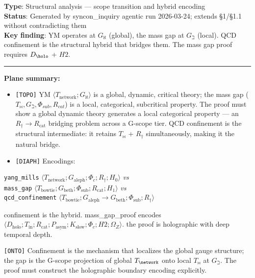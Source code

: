\documentclass[12pt,a4paper]{article}
\newcommand{\pilcrow}{\S}
\begin{document}
\textbf{Type}: Structural analysis --- scope transition and hybrid encoding   \\
\textbf{Status}: Generated by syncon\_inquiry agentic run 2026-03-24; extends \pilcrow{}1/\pilcrow{}1.1 without contradicting them   \\
\textbf{Key finding}: YM operates at $G_{\aleph}$ (global), the mass gap at $G_{\beth}$ (local). QCD confinement is the structural hybrid that bridges them. The mass gap proof requires $D_{\holo}$ + $H2$.

\begin{center}
\rule{0.5\textwidth}{0.4pt}
\end{center}

\textbf{Plane summary:}

\begin{itemize}
    \item \texttt{{[}TOPO{]}} YM $\langle T_{\text{network}}; G_{\aleph} \rangle$ is a global, dynamic, critical theory; the mass gap ($T_{\bowtie}, G_{\beth}, \Phi_{sub}, R_{cat}$) is a local, categorical, subcritical property. The proof must show a global dynamic theory generates a local categorical property --- an $R_{\dagger} \to R_{\text{cat}}$ bridging problem across a G-scope tier. QCD confinement is the structural intermediate: it retains $T_{\bowtie}$ + $R_{\dagger}$ simultaneously, making it the natural bridge.
    \item \texttt{{[}DIAPH{]}} Encodings:
\end{itemize}

\texttt{yang\_mills} $\langle T_{\text{network}}; G_{\text{aleph}}; \Phi_c; R_{\dagger}; {H_0} \rangle$ \emph{vs}  \\
\texttt{mass\_gap} $\langle T_{\text{bowtie}}; G_{\text{beth}}; \Phi_{\text{sub}}; R_{\text{cat}}; {H_1} \rangle$ \emph{vs}  \\
\texttt{qcd\_confinement} $\langle T_{\text{bowtie}}; G_{\text{aleph}} \to G_{\text{beth}}; \Phi_{\text{sub}}; R_{\dagger} \rangle$

confinement is the hybrid. mass\_gap\_proof encodes $\langle D_{\text{holo}}; T_{\text{in}}; R_{\text{cat}}; P_{\text{asym}}; K_{\text{slow}}; \Phi_c; {H2}; \Omega_Z\rangle$. the proof is holographic with deep temporal depth.

\texttt{{[}ONTO{]}} Confinement is the mechanism that localizes the global gauge structure; the gap is the G-scope projection of global $T_{\network}$ onto local $T_{\bowtie}$ at $G_{\beth}$. The proof must construct the holographic boundary encoding explicitly.
\end{document}
